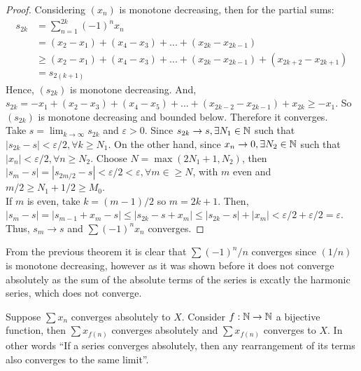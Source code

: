 \begin{proof}
    Considering $(x_n)$ is monotone decreasing, then for the partial sums:
    \begin{align*}
        s_{2k} &= \sum \limits_{n=1}^{2k} (-1)^n x_n \\
        &= (x_2-x_1) + (x_4-x_3) + ... + (x_{2k} - x_{2k-1}) \\
        &\geq (x_2-x_1) + (x_4-x_3) + ... + (x_{2k} - x_{2k-1}) + (x_{2k+2} - x_{2k+1}) \\
        &= s_{2(k+1)}
    \end{align*}
    Hence, $(s_{2k})$ is monotone decreasing. And, $s_{2k} = -x_1 + (x_2-x_3) + (x_4-x_5) + ... + (x_{2k-2}-x_{2k-1}) + x_{2k} \geq -x_1$. So $(s_{2k})$ is monotone decreasing and bounded below. Therefore it converges.  \\
    Take $s = \lim_{k\to \infty} s_{2k}$ and $\varepsilon > 0$. Since $s_{2k} \to s, \exists N_1 \in \mathbb{N}$ such that $|s_{2k} - s| < \varepsilon/2, \forall k \geq N_1$. On the other hand, since $x_n \to 0, \exists N_2 \in \mathbb{N}$ such that $|x_n| < \varepsilon/2, \forall n \geq N_2$. Choose $N = \max(2N_1 + 1, N_2)$, then $|s_m-s| = |s_{2m/2}-s| < \varepsilon/2 < \varepsilon, \forall m \in \geq N$, with $m$ even and $m/2 \geq N_1 + 1/2 \geq M_0$. \\
    If $m$ is even, take $k=(m-1)/2$ so $m = 2k + 1$. Then, $|s_m-s| = |s_{m-1} + x_m - s| \leq |s_{2k} - s + x_m| \leq |s_{2k} - s| + |x_m| < \varepsilon/2 + \varepsilon/2 = \varepsilon$.
    Thus, $s_m \to s$ and $\sum (-1)^n x_n$ converges.
\end{proof}
\vspace{1em}
From the previous theorem it is clear that $\sum (-1)^n/n$ converges since $(1/n)$ is monotone decreasing, however as it was shown before it does not converge absolutely as the sum of the absolute terms of the series is excatly the harmonic series, which does not converge.

\begin{theorem}
    Suppose $\sum x_n$ converges absolutely to $X$. Consider $f: \mathbb{N} \to \mathbb{N}$ a bijective function, then $\sum x_{f(n)}$ converges absolutely and $\sum x_{f(n)}$ converges to $X$. In other words ``If a series converges absolutely, then any rearrangement of its terms also converges to the same limit''.
\end{theorem}

